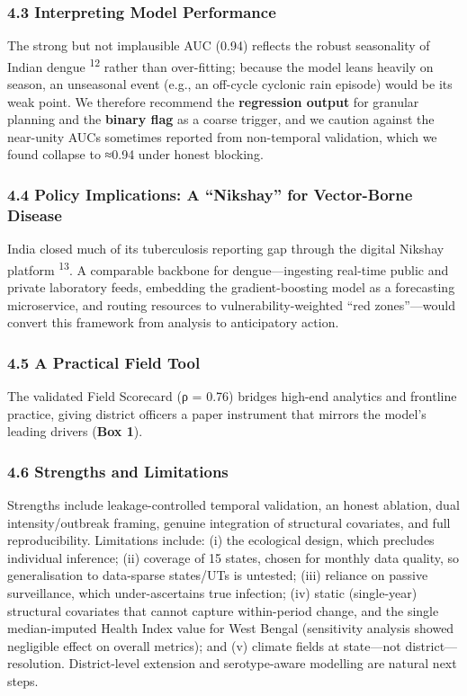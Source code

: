 \documentclass[
  10pt,
  twocolumn]{article}
\begin{document}
\subsubsection{4.3 Interpreting Model
Performance}\label{interpreting-model-performance}

The strong but not implausible AUC (0.94) reflects the robust
seasonality of Indian dengue \textsuperscript{12} rather than
over-fitting; because the model leans heavily on season, an unseasonal
event (e.g., an off-cycle cyclonic rain episode) would be its weak
point. We therefore recommend the \textbf{regression output} for
granular planning and the \textbf{binary flag} as a coarse trigger, and
we caution against the near-unity AUCs sometimes reported from
non-temporal validation, which we found collapse to ≈0.94 under honest
blocking.

\subsubsection{4.4 Policy Implications: A ``Nikshay'' for Vector-Borne
Disease}\label{policy-implications-a-nikshay-for-vector-borne-disease}

India closed much of its tuberculosis reporting gap through the digital
Nikshay platform \textsuperscript{13}. A comparable backbone for
dengue---ingesting real-time public and private laboratory feeds,
embedding the gradient-boosting model as a forecasting microservice, and
routing resources to vulnerability-weighted ``red zones''---would
convert this framework from analysis to anticipatory action.

\subsubsection{4.5 A Practical Field Tool}\label{a-practical-field-tool}

The validated Field Scorecard (ρ = 0.76) bridges high-end analytics and
frontline practice, giving district officers a paper instrument that
mirrors the model's leading drivers (\textbf{Box 1}).

\subsubsection{4.6 Strengths and
Limitations}\label{strengths-and-limitations}

Strengths include leakage-controlled temporal validation, an honest
ablation, dual intensity/outbreak framing, genuine integration of
structural covariates, and full reproducibility. Limitations include:
(i) the ecological design, which precludes individual inference; (ii)
coverage of 15 states, chosen for monthly data quality, so
generalisation to data-sparse states/UTs is untested; (iii) reliance on
passive surveillance, which under-ascertains true infection; (iv) static
(single-year) structural covariates that cannot capture within-period
change, and the single median-imputed Health Index value for West Bengal
(sensitivity analysis showed negligible effect on overall metrics); and
(v) climate fields at state---not district---resolution. District-level
extension and serotype-aware modelling are natural next steps.
\end{document}
